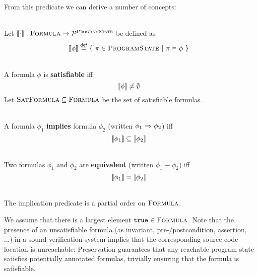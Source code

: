 \begin{description}
    From this predicate we can derive a number of concepts:
    
    \begin{definition}~\\
        \label{def:frm-den-sem}
        Let $\llbracket {\cdot} \rrbracket : \textup{\textsc{Formula}} \rightarrow \mathcal{P}^{\textup{\textsc{ProgramState}}}$ be defined as
        \begin{displaymath}
        \llbracket {\phi} \rrbracket \overset{\textup{\textmd{\textsf{def}}}}{=} \{~ \pi \in \textup{\textsc{ProgramState}} ~|~ \pi \,\,{\vDash}\,\, \phi ~\}
        \end{displaymath}
    \end{definition}
        
    
    \begin{definition}~\\
        A formula $\phi$ is \textbf{satisfiable} iff $$\llbracket {\phi} \rrbracket \neq \emptyset$$
        Let $\textup{\textsc{SatFormula}} \subseteq \textup{\textsc{Formula}}$ be the set of satisfiable formulas.
    \end{definition}
    
    \begin{definition}~\\
        A formula $\phi_1$ \textbf{implies} formula $\phi_2$ (written ${\phi_1} \,\,{\Rightarrow}\,\, {\phi_2}$) iff
        \begin{displaymath}
        \llbracket {\phi_1} \rrbracket \subseteq \llbracket {\phi_2} \rrbracket
        \end{displaymath}
    \end{definition}
    
    \begin{definition}~\\
        Two formulas $\phi_1$ and $\phi_2$ are \textbf{equivalent} (written $\phi_1 \equiv \phi_2$) iff
        \begin{displaymath}
        \llbracket {\phi_1} \rrbracket = \llbracket {\phi_2} \rrbracket
        \end{displaymath}
    \end{definition} 
    
    
    \begin{lemma}~\\
        The implication predicate is a partial order on $\textup{\textsc{Formula}}$.
    \end{lemma}
    
    We assume that there is a largest element $\textup{\texttt{true}} \in \textup{\textsc{Formula}}$.
    Note that the presence of an unsatisfiable formula (as invariant, pre-/postcondition, assertion, ...) in a sound verification system implies that the corresponding source code location is unreachable:
    Preservation guarantees that any reachable program state satisfies potentially annotated formulas, trivially ensuring that the formula is satisfiable.
    

\end{description}
